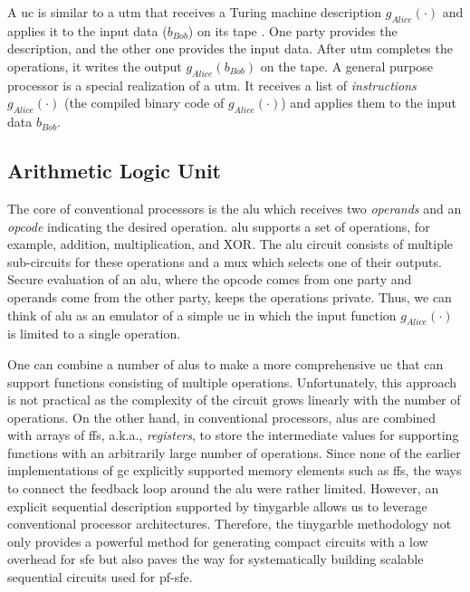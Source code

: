 A \acrshort{uc} is similar to a \acrfull{utm} \cite{turing1936computable,herken1995universal} that receives a Turing machine description $g_{Alice}(\cdot)$ and applies it to the input data ($b_{Bob}$) on its tape \cite{davis2001engines}.
One party provides the description, and the other one provides the input data.
After \acrshort{utm} completes the operations, it writes the output $g_{Alice}(b_{Bob})$ on the tape.
A general purpose processor is a special realization of a \acrshort{utm}.
It receives a list of \emph{instructions} $g_{Alice}(\cdot)$ (the compiled binary code of $g_{Alice}(\cdot)$) and applies them to the input data $b_{Bob}$.

\subsection{Arithmetic Logic Unit}\label{ssec:processor-alu}
The core of conventional processors is the \acrfull{alu} which receives two \emph{operands} and an \emph{opcode} indicating the desired operation.
\acrshort{alu} supports a set of operations, for example, addition, multiplication, and XOR.
The \acrshort{alu} circuit consists of multiple sub-circuits for these operations and a \acrfull{mux} which selects one of their outputs.
Secure evaluation of an \acrshort{alu}, where the opcode comes from one party and operands come from the other party, keeps the operations private.
Thus, we can think of \acrshort{alu} as an emulator of a simple \acrshort{uc} in which the input function $g_{Alice}(\cdot)$ is limited to a single operation.

One can combine a number of \acrshort{alu}s to make a more comprehensive \acrshort{uc} that can support functions consisting of multiple operations.
Unfortunately, this approach is not practical as the complexity of the circuit grows linearly with the number of operations.
On the other hand, in conventional processors, \acrshort{alu}s are combined with arrays of \acrfull{ff}s, a.k.a., \emph{registers}, to store the intermediate values for supporting functions with an arbitrarily large number of operations.
Since none of the earlier implementations of \acrshort{gc} explicitly supported memory elements such as \acrshort{ff}s, the ways to connect the feedback loop around the \acrshort{alu} were rather limited.
However, an explicit sequential description supported by \gls{tinygarble} allows us to leverage conventional processor architectures.
Therefore, the \gls{tinygarble} methodology not only provides a powerful method for generating compact circuits with a low overhead for \acrshort{sfe} but also paves the way for systematically building scalable sequential circuits used for \acrshort{pf-sfe}.


